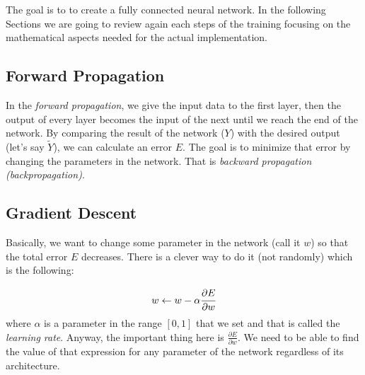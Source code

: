%

The goal is to to create a fully connected neural network. In the following Sections we are going to review again each steps of the training focusing on the mathematical aspects needed for the actual implementation.

\subsection{Forward Propagation}
In the \emph{forward propagation}, we give the input data to the first layer, then the output of every layer becomes the input of the next until we reach the end of the network. By comparing the result of the network ($Y$) with the desired output (let’s say $\tilde{Y}$), we can calculate an error $E$. The goal is to minimize that error by changing the parameters in the network. That is \emph{backward propagation (backpropagation)}.

\subsection{Gradient Descent}

Basically, we want to change some parameter in the network (call it $w$) so that the total error $E$ decreases. There is a clever way to do it (not randomly) which is the following:

\begin{equation}
	w\leftarrow w - \alpha\cfrac{\partial E}{\partial w}
\end{equation}
where $\alpha$ is a parameter in the range $[0,1]$ that we set and that is called the \emph{learning rate}. 
Anyway, the important thing here is $\frac{\partial E}{\partial w}$. 
We need to be able to find the value of that expression for any parameter of the network regardless of its architecture.

